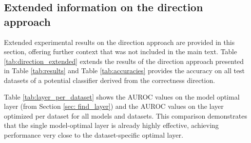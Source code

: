 \documentclass{article} %
\begin{document}
\begin{table}[ht]
\centering
\caption{Model performance across tasks (\%).}
\label{tab:performance}
\end{table}

\subsection{Extended information on the direction approach}

Extended experimental results on the direction approach are provided in this section, offering further context that was not included in the main text. Table \ref{tab:direction_extended} extends the results of the direction approach presented in Table \ref{tab:results} and Table \ref{tab:accuracies} provides the accuracy on all test datasets of a potential classifier derived from the correctness direction. 

Table \ref{tab:layer_per_dataset} shows the AUROC values on the model optimal layer (from Section \ref{sec: find_layer}) and the AUROC values on the layer optimized per dataset for all models and datasets. This comparison demonstrates that the single model-optimal layer is already highly effective, achieving performance very close to the dataset-specific optimal layer.
\end{document}

